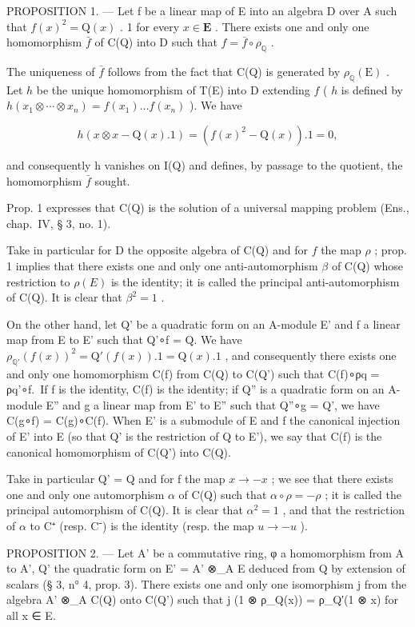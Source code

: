 PROPOSITION 1. --- Let f be a linear map of E into an algebra D over A such that \(f(x)^{2} = \mathrm{Q}(x)\) . 1 for every \(x \in \mathbf{E}\) . There exists one and only one homomorphism \(\bar{f}\) of C(Q) into D such that \(f = \bar{f} \circ \rho_{\mathbb{Q}}\) .

The uniqueness of \(\bar{f}\) follows from the fact that C(Q) is generated by \(\rho_{\mathbb{Q}}(\mathrm{E})\) . Let \(h\) be the unique homomorphism of T(E) into D extending \(f\) ( \(h\) is defined by \(h(x_1 \otimes \cdots \otimes x_n) = f(x_1) \ldots f(x_n)\) ). We have

\[
h (x \otimes x - \mathrm{Q} (x). 1) = (f (x) ^ {2} - \mathrm{Q} (x)). 1 = 0,
\]

and consequently h vanishes on I(Q) and defines, by passage to the quotient, the homomorphism \(\bar{f}\) sought.

Prop. 1 expresses that C(Q) is the solution of a universal mapping problem (Ens., chap.~IV, § 3, no. 1).

Take in particular for D the opposite algebra of C(Q) and for \(f\) the map \(\rho\) ; prop. 1 implies that there exists one and only one anti-automorphism \(\beta\) of C(Q) whose restriction to \(\rho(E)\) is the identity; it is called the principal anti-automorphism of C(Q). It is clear that \(\beta^{2} = 1\) .

On the other hand, let Q' be a quadratic form on an A-module E' and f a linear map from E to E' such that Q'∘f = Q. We have \(\rho_{\mathbb{Q}'}(f(x))^{2} = \mathrm{Q}'(f(x)).1 = \mathrm{Q}(x).1\) , and consequently there exists one and only one homomorphism C(f) from C(Q) to C(Q') such that C(f)∘ρq = ρq'∘f.~If f is the identity, C(f) is the identity; if Q'' is a quadratic form on an A-module E'' and g a linear map from E' to E'' such that Q''∘g = Q', we have C(g∘f) = C(g)∘C(f). When E' is a submodule of E and f the canonical injection of E' into E (so that Q' is the restriction of Q to E'), we say that C(f) is the canonical homomorphism of C(Q') into C(Q).

Take in particular Q' = Q and for f the map \(x \to -x\) ; we see that there exists one and only one automorphism \(\alpha\) of C(Q) such that \(\alpha \circ \rho = -\rho\) ; it is called the principal automorphism of C(Q). It is clear that \(\alpha^{2} = 1\) , and that the restriction of \(\alpha\) to C⁺ (resp. C⁻) is the identity (resp. the map \(u \to -u\) ).

PROPOSITION 2. --- Let A' be a commutative ring, φ a homomorphism from A to A', Q' the quadratic form on E' = A' ⊗\_A E deduced from Q by extension of scalars (§ 3, n° 4, prop. 3). There exists one and only one isomorphism j from the algebra A' ⊗\_A C(Q) onto C(Q') such that j (1 ⊗ ρ\_Q(x)) = ρ\_Q′(1 ⊗ x) for all x ∈ E.

